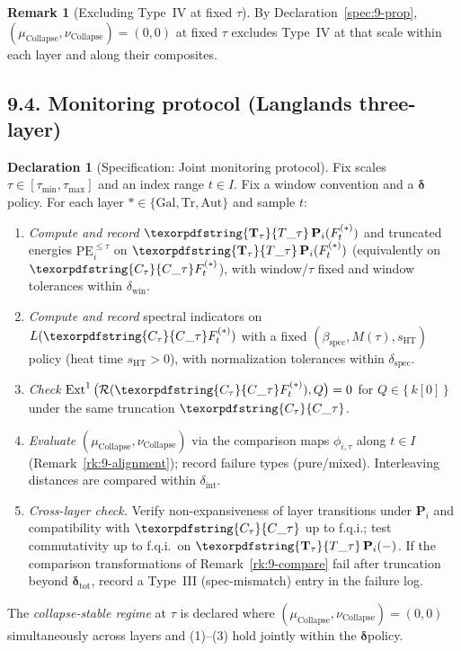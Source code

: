 \documentclass[11pt]{article}
\DeclareMathOperator{\Ext}{Ext}
\DeclareRobustCommand{\hyp}{\nobreakdash-}
\newcommand{\Rfun}{\mathcal{R}}
\numberwithin{equation}{section}
\theoremstyle{definition}
\newtheorem{remark}[theorem]{Remark}
\newtheorem{declaration}[theorem]{Declaration}
\DeclareRobustCommand{\Ttau}{\texorpdfstring{\ensuremath{\mathbf{T}_{\tau}}}{T\_\tau}}
\DeclareRobustCommand{\Ctau}{\texorpdfstring{\ensuremath{C_{\tau}}}{C\_\tau}}
\DeclareRobustCommand{\muc}{\mu_{\mathrm{Collapse}}}
\DeclareRobustCommand{\nuc}{\nu_{\mathrm{Collapse}}}
\DeclareRobustCommand{\Qtest}{\{\,k[0]\,\}}
\begin{document}
\begin{remark}[Excluding Type~IV at fixed \(\tau\)]\label{rk:9-typeIV}
By Declaration~\ref{spec:9-prop}, \((\muc,\nuc)=(0,0)\) at fixed \(\tau\) excludes Type~IV at that scale within each layer and along their composites.
\end{remark}

\subsection*{9.4. Monitoring protocol (Langlands three\hyp layer)}
\begin{declaration}[Specification: Joint monitoring protocol]\label{spec:9-protocol}
Fix scales \(\tau\in[\tau_{\min},\tau_{\max}]\) and an index range \(t\in I\).
Fix a window convention and a \(\boldsymbol{\delta}\)\nobreakdash policy.
For each layer \(\ast\in\{\mathrm{Gal},\mathrm{Tr},\mathrm{Aut}\}\) and sample \(t\):
\begin{enumerate}
  \item \emph{Compute and record} \(\Ttau\,\mathbf{P}_i(F^{(\ast)}_t)\) and truncated energies \(\mathrm{PE}_i^{\le \tau}\) on \(\Ttau\,\mathbf{P}_i(F^{(\ast)}_t)\) (equivalently on \(\Ctau F^{(\ast)}_t\)), with window/\(\tau\) fixed and window tolerances within \(\delta_{\mathrm{win}}\).
  \item \emph{Compute and record} spectral indicators on \(L(\Ctau F^{(\ast)}_t)\) with a fixed \((\beta_{\mathrm{spec}},M(\tau),s_{\mathrm{HT}})\) policy (heat time \(s_{\mathrm{HT}}>0\)), with normalization tolerances within \(\delta_{\mathrm{spec}}\).
  \item \emph{Check} \(\Ext^1\big(\Rfun(\Ctau F^{(\ast)}_t),Q\big)=0\) for \(Q\in\Qtest\) under the same truncation \(\Ctau\).
  \item \emph{Evaluate} \((\muc,\nuc)\) via the comparison maps \(\phi_{i,\tau}\) along \(t\in I\) (Remark~\ref{rk:9-alignment}); record failure types (pure/mixed). Interleaving distances are compared within \(\delta_{\mathrm{int}}\).
  \item \emph{Cross\hyp layer check.} Verify non\hyp expansiveness of layer transitions under \(\mathbf{P}_i\) and compatibility with \(\Ctau\) up to f.q.i.; test commutativity up to f.q.i.\ on \(\Ttau\,\mathbf{P}_i(-)\).
  If the comparison transformations of Remark~\ref{rk:9-compare} fail after truncation beyond \(\boldsymbol{\delta}_{\mathrm{tot}}\), record a Type~III (spec\hyp mismatch) entry in the failure log.
\end{enumerate}
The \emph{collapse\hyp stable regime} at \(\tau\) is declared where \((\muc,\nuc)=(0,0)\) simultaneously across layers and (1)–(3) hold jointly within the \(\boldsymbol{\delta}\)\nobreakdash policy.
\end{declaration}
\end{document}
